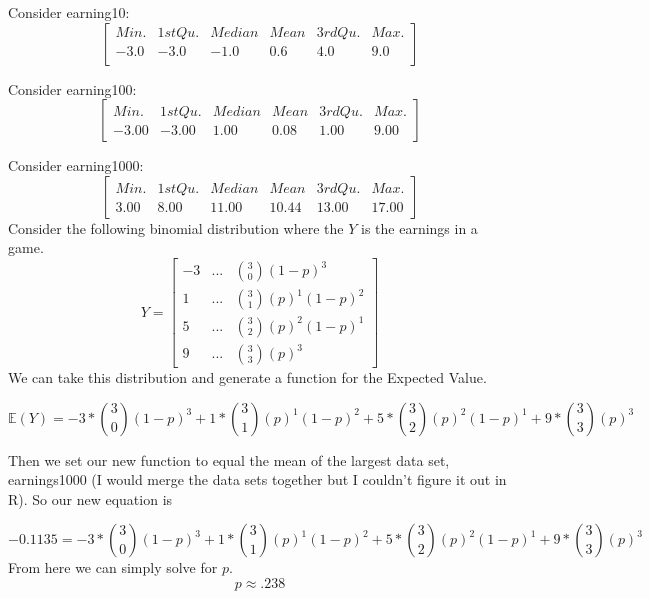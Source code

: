 \documentclass{report}
\begin{document}
\begin{enumerate}
Consider earning10:\\
\begin{equation}
\begin{bmatrix}
   Min.&1st Qu.&Median&Mean&3rd Qu.&Max.\\
   -3.0&-3.0 &-1.0 &0.6 &4.0&9.0\\ 
\end{bmatrix}
\end{equation}



Consider earning100:\\
\begin{equation}
\begin{bmatrix}
   Min.&1st Qu.&Median&Mean&3rd Qu.&Max.\\
  -3.00&-3.00 &1.00 &0.08 &1.00&9.00 
\end{bmatrix}
\end{equation}


Consider earning1000:\\
\begin{equation}
\begin{bmatrix}
   Min.&1st Qu.&Median&Mean&3rd Qu.&Max.\\
   3.00 &8.00&11.00&10.44&13.00&17.00 
\end{bmatrix}
\end{equation}
Consider the following binomial distribution where the $Y$ is the earnings in a game.
\begin{equation}
Y = 
\begin{bmatrix}
   -3&...&{3 \choose 0}(1-p)^3\\
   1 &...&{3 \choose 1}(p)^1(1-p)^2\\
     5&...&{3 \choose 2}(p)^2(1-p)^1\\
    9&...&{3 \choose 3}(p)^3
\end{bmatrix}
\end{equation}
We can take this  distribution and generate a function for the Expected Value. 

\begin{equation}
\mathbb{E}(Y) = -3*{3 \choose 0}(1-p)^3 + 1*{3 \choose 1}(p)^1(1-p)^2 + 5*{3 \choose 2}(p)^2(1-p)^1 + 9*{3 \choose 3}(p)^3
\end{equation}

Then we set our new function to equal the mean of the largest data set, earnings1000 (I would merge the data sets together but I couldn't figure it out in R). So our new equation is 

\begin{equation}
-0.1135 = -3*{3 \choose 0}(1-p)^3 + 1*{3 \choose 1}(p)^1(1-p)^2 + 5*{3 \choose 2}(p)^2(1-p)^1 + 9*{3 \choose 3}(p)^3
\end{equation}
 From here we can simply solve for $p$.
 \begin{equation}
p  \approx .238
\end{equation}










\end{enumerate}
\end{document}
